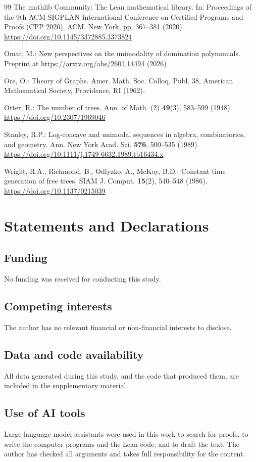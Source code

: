 \documentclass[smallextended,envcountsect,envcountsame]{svjour3}
\begin{document}
\begin{thebibliography}{99}
 The mathlib Community: The Lean mathematical library. In: Proceedings of the 9th ACM SIGPLAN International Conference on Certified Programs and Proofs (CPP 2020), ACM, New York, pp. 367--381 (2020). \url{https://doi.org/10.1145/3372885.3373824}

 Omar, M.: New perspectives on the unimodality of domination polynomials. Preprint at \url{https://arxiv.org/abs/2601.14494} (2026)

 Ore, O.: Theory of Graphs. Amer. Math. Soc. Colloq. Publ. 38, American Mathematical Society, Providence, RI (1962).

 Otter, R.: The number of trees. Ann. of Math. (2) \textbf{49}(3), 583--599 (1948). \url{https://doi.org/10.2307/1969046}

 Stanley, R.P.: Log-concave and unimodal sequences in algebra, combinatorics, and geometry. Ann. New York Acad. Sci. \textbf{576}, 500--535 (1989). \url{https://doi.org/10.1111/j.1749-6632.1989.tb16434.x}

 Wright, R.A., Richmond, B., Odlyzko, A., McKay, B.D.: Constant time generation of free trees. SIAM J. Comput. \textbf{15}(2), 540--548 (1986). \url{https://doi.org/10.1137/0215039}

\end{thebibliography}


\section*{Statements and Declarations}

\subsection*{Funding}
No funding was received for conducting this study.

\subsection*{Competing interests}
The author has no relevant financial or non-financial interests to disclose.

\subsection*{Data and code availability}
All data generated during this study, and the code that produced them, are
included in the supplementary material.

\subsection*{Use of AI tools}
Large language model assistants were used in this work to search for
proofs, to write the computer programs and the Lean code, and to draft the
text. The author has checked all arguments and takes full responsibility for
the content.
\end{document}
